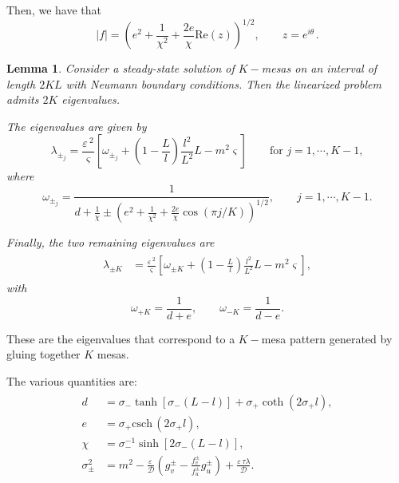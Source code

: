 \documentclass[a4paper,10pt]{article}
\newcommand{\tH}{\ensuremath{\theta\,}}
\newcommand{\lA}{\ensuremath{\lambda}}
\newcommand{\sI}{\ensuremath{\sigma}}
\newcommand{\vA}{\ensuremath{\varsigma}}
\newcommand{\Ep}{\ensuremath{\varepsilon\,}}
\newcommand{\DD}{\ensuremath{\mathcal{D}}}
\newcommand{\csch}{\mathrm{csch} \,}
\newtheorem{lemma}{Lemma}
\begin{document}
Then, we have that
% 
\[
  |f| = \left(e^2 + \frac{1}{\chi^2} + \frac{2e}{\chi}\mathrm{Re}(z) \right)^{1/2},\qquad z=e^{i\tH}.
\]
% 

\begin{lemma}
  Consider a steady-state solution of $K-$mesas on an interval of length $2KL$ with Neumann boundary conditions. Then the linearized problem admits $2K$ eigenvalues.

The eigenvalues are given by
% 
\begin{equation*}
	\lA_{\pm_j} = \frac{\Ep^2}{\vA}\left[\omega_{\pm_j} + \left(1-\frac{L}{l}\right)\frac{l^2}{L^2}L-m^2\vA \right]\qquad\text{for }j=1,\cdots,K-1,
\end{equation*}
% 
where
% 
\begin{equation*}
  \omega_{\pm_j}=\frac{1}{d+\frac{1}{\chi}\pm \left(e^2 + \frac{1}{\chi^2} + \frac{2e}{\chi}\cos(\pi j/K) \right)^{1/2}},\qquad j=1,\cdots,K-1.
\end{equation*}
% 

Finally, the two remaining eigenvalues are
% 
\begin{equation*}
	\begin{split}
	\begin{aligned}
	  \lA_{\pm K} &= \frac{\Ep^2}{\vA}\left[\omega_{\pm K}+\left(1-\frac{L}{l}\right)\frac{l^2}{L^2}L - m^2\vA \right],
	\end{aligned}
	\end{split}
\end{equation*}
%
with 
% 
\[
  \omega_{+K}=\frac{1}{d+e},\qquad\omega_{-K}=\frac{1}{d-e}.
\]
% 
\end{lemma}

These are the eigenvalues that correspond to a $K-$mesa pattern generated by gluing together $K$ mesas.

The various quantities are:
% 
\begin{equation*}
	\begin{split}
	\begin{aligned}
	  d &= \sI_-\tanh[\sI_-(L-l)]+\sI_+\coth(2\sI_+l),\\
	  e &= \sI_+\csch(2\sI_+l),\\
	  \chi &= \sI_-^{-1}\sinh[2\sI_-(L-l)],\\
	  \sI_{\pm}^2 &= m^2  - \frac{\Ep}{\DD}\left(g_v^{\pm} - \frac{f_v^{\pm}}{f_u^{\pm}}g_u^{\pm} \right) + \frac{\Ep\tau\lA}{\DD}.
	\end{aligned}
	\end{split}
\end{equation*}
%
\end{document}
